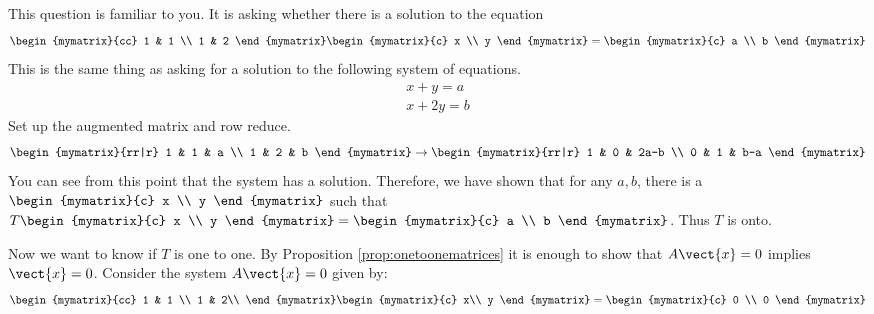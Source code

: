 \begin{solution}
This question is familiar to you. It is asking whether
there is a solution to the equation
\begin{equation*}
\begin{mymatrix}{cc}
1 & 1 \\
1 & 2
\end{mymatrix} \begin{mymatrix}{c}
x \\
y
\end{mymatrix} =\begin{mymatrix}{c}
a \\
b
\end{mymatrix}
\end{equation*}
This is the same thing as asking for a solution to the following system of
equations.
\begin{equation*}
\begin{array}{c}
x+y=a \\
x+2y=b
\end{array}
\end{equation*}
Set up the augmented matrix and row reduce.
\begin{equation}
\begin{mymatrix}{rr|r}
1 & 1 & a \\
1 & 2 & b
\end{mymatrix} \rightarrow \begin{mymatrix}{rr|r}
1 & 0 & 2a-b \\
0 & 1 & b-a
\end{mymatrix}
\label{ontomatrix}
\end{equation}
You can see from this point that the system has a solution. Therefore,
we have shown that for any $a, b$, there is a $
\begin{mymatrix}{c}
x \\
y
\end{mymatrix}$ such that $T\begin{mymatrix}{c}
x \\
y
\end{mymatrix} =\begin{mymatrix}{c}
a \\
b
\end{mymatrix}$.
Thus $T$ is onto.

Now we want to know if $T$ is one to one. 
By Proposition \ref{prop:onetoonematrices} it is enough to show that $A\vect{x}=0$ implies $\vect{x}=0$. 
Consider the system $A\vect{x}=0$ given by:
\begin{equation*}
\begin{mymatrix}{cc}
1 & 1 \\
1 & 2\\
\end{mymatrix}
\begin{mymatrix}{c}
x\\
y
\end{mymatrix}
=
\begin{mymatrix}{c}
0 \\
0
\end{mymatrix}
\end{equation*}


\end{solution}
